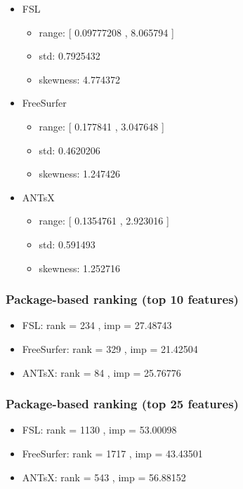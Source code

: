 \documentclass[
  10pt,
]{article}
\begin{document}
\begin{itemize}
\item
  FSL

  \begin{itemize}
  \item
    range: {[} 0.09777208 , 8.065794 {]}
  \item
    std: 0.7925432
  \item
    skewness: 4.774372
  \end{itemize}
\item
  FreeSurfer

  \begin{itemize}
  \item
    range: {[} 0.177841 , 3.047648 {]}
  \item
    std: 0.4620206
  \item
    skewness: 1.247426
  \end{itemize}
\item
  ANTsX

  \begin{itemize}
  \item
    range: {[} 0.1354761 , 2.923016 {]}
  \item
    std: 0.591493
  \item
    skewness: 1.252716
  \end{itemize}
\end{itemize}

\hypertarget{package-based-ranking-top-10-features-9}{%
\subsubsection{Package-based ranking (top 10
features)}\label{package-based-ranking-top-10-features-9}}

\begin{itemize}
\item
  FSL: rank = 234 , imp = 27.48743
\item
  FreeSurfer: rank = 329 , imp = 21.42504
\item
  ANTsX: rank = 84 , imp = 25.76776
\end{itemize}

\hypertarget{package-based-ranking-top-25-features-9}{%
\subsubsection{Package-based ranking (top 25
features)}\label{package-based-ranking-top-25-features-9}}

\begin{itemize}
\item
  FSL: rank = 1130 , imp = 53.00098
\item
  FreeSurfer: rank = 1717 , imp = 43.43501
\item
  ANTsX: rank = 543 , imp = 56.88152
\end{itemize}
\end{document}
